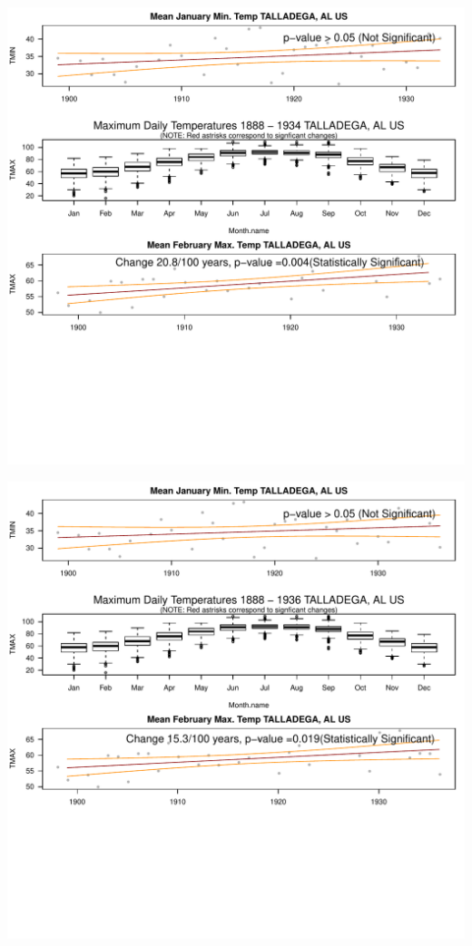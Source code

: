 \documentclass{article}\usepackage[]{graphicx}\usepackage[]{color}
\makeatletter
\def\maxwidth{ %
  \ifdim\Gin@nat@width>\linewidth
    \linewidth
  \else
    \Gin@nat@width
  \fi
}
\newenvironment{knitrout}{}{} %
\makeatother
\begin{document}
\begin{knitrout}
\includegraphics[width=\maxwidth]{figure/static_template-13} 

\includegraphics[width=\maxwidth]{figure/static_template-14} 


\end{knitrout}
\end{document}
